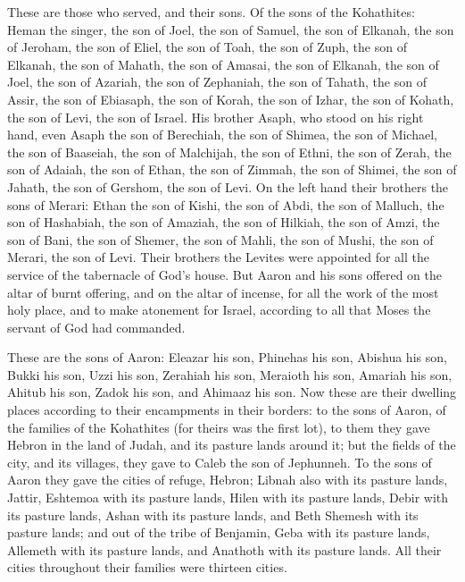 {These are those who served, and their sons. Of the sons of the Kohathites: Heman the singer, the son of Joel, the son of Samuel,
the son of Elkanah, the son of Jeroham, the son of Eliel, the son of Toah,
the son of Zuph, the son of Elkanah, the son of Mahath, the son of Amasai,
the son of Elkanah, the son of Joel, the son of Azariah, the son of Zephaniah,
the son of Tahath, the son of Assir, the son of Ebiasaph, the son of Korah,
the son of Izhar, the son of Kohath, the son of Levi, the son of Israel.
His brother Asaph, who stood on his right hand, even Asaph the son of Berechiah, the son of Shimea,
the son of Michael, the son of Baaseiah, the son of Malchijah,
the son of Ethni, the son of Zerah, the son of Adaiah,
the son of Ethan, the son of Zimmah, the son of Shimei,
the son of Jahath, the son of Gershom, the son of Levi.
On the left hand their brothers the sons of Merari: Ethan the son of Kishi, the son of Abdi, the son of Malluch,
the son of Hashabiah, the son of Amaziah, the son of Hilkiah,
the son of Amzi, the son of Bani, the son of Shemer,
the son of Mahli, the son of Mushi, the son of Merari, the son of Levi.
Their brothers the Levites were appointed for all the service of the tabernacle of God’s house.
But Aaron and his sons offered on the altar of burnt offering, and on the altar of incense, for all the work of the most holy place, and to make atonement for Israel, according to all that Moses the servant of God had commanded.
\par }{\PP {}These are the sons of Aaron: Eleazar his son, Phinehas his son, Abishua his son,
Bukki his son, Uzzi his son, Zerahiah his son,
Meraioth his son, Amariah his son, Ahitub his son,
Zadok his son, and Ahimaaz his son.
Now these are their dwelling places according to their encampments in their borders: to the sons of Aaron, of the families of the Kohathites (for theirs was the first lot),
to them they gave Hebron in the land of Judah, and its pasture lands around it;
but the fields of the city, and its villages, they gave to Caleb the son of Jephunneh.
To the sons of Aaron they gave the cities of refuge, Hebron; Libnah also with its pasture lands, Jattir, Eshtemoa with its pasture lands,
Hilen with its pasture lands, Debir with its pasture lands,
Ashan with its pasture lands, and Beth Shemesh with its pasture lands;
and out of the tribe of Benjamin, Geba with its pasture lands, Allemeth with its pasture lands, and Anathoth with its pasture lands. All their cities throughout their families were thirteen cities.
}
